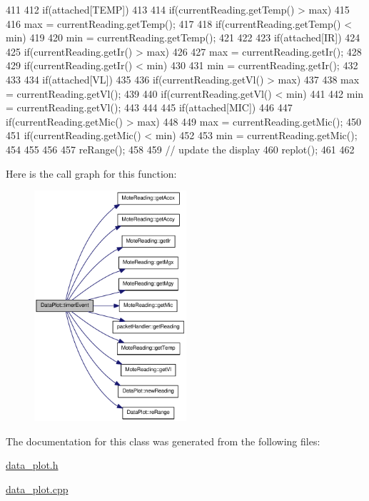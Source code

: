 \begin{DoxyCode}
{{{411             }
412             if(attached[TEMP])
413             {
414                 if(currentReading.getTemp() > max)
415                 {
416                     max = currentReading.getTemp();
417                 }
418                 if(currentReading.getTemp() < min)
419                 {
420                     min = currentReading.getTemp();
421                 }
422             }
423             if(attached[IR])
424             {
425                 if(currentReading.getIr() > max)
426                 {
427                     max = currentReading.getIr();
428                 }
429                 if(currentReading.getIr() < min)
430                 {
431                     min = currentReading.getIr();
432                 }
433             }
434             if(attached[VL])
435             {
436                 if(currentReading.getVl() > max)
437                 {
438                     max = currentReading.getVl();
439                 }
440                 if(currentReading.getVl() < min)
441                 {
442                     min = currentReading.getVl();
443                 }
444             }
445             if(attached[MIC])
446             {
447                 if(currentReading.getMic() > max)
448                 {
449                     max = currentReading.getMic();
450                 }
451                 if(currentReading.getMic() < min)
452                 {
453                     min = currentReading.getMic();
454                 }
455             }
456 
457             reRange();
458         }
459        // update the display
460     replot();
461 
462     }
\end{DoxyCode}




Here is the call graph for this function:\nopagebreak
\begin{figure}[H]
\begin{center}
\leavevmode
\includegraphics[width=160pt]{classDataPlot_a41c9c4bc12d8d3e3abdf893c4fcfad7b_cgraph}
\end{center}
\end{figure}




The documentation for this class was generated from the following files:\begin{DoxyCompactItemize}
\item 
\hyperlink{data__plot_8h}{data\_\-plot.h}\item 
\hyperlink{data__plot_8cpp}{data\_\-plot.cpp}\end{DoxyCompactItemize}
